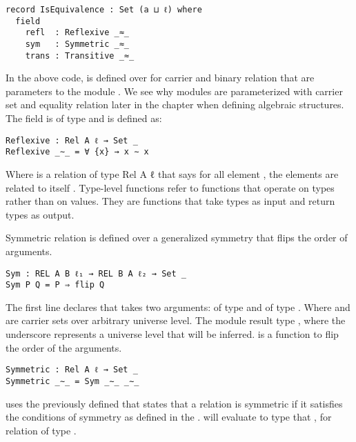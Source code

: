\begin{verbatim}
record IsEquivalence : Set (a ⊔ ℓ) where
  field
    refl  : Reflexive _≈_
    sym   : Symmetric _≈_
    trans : Transitive _≈_
\end{verbatim}

In the above code,  is defined over for carrier  and binary relation  that are parameters to the
module . We see why modules are parameterized with carrier
set and equality relation later in the chapter when defining algebraic
structures. The field  is of type  and is
defined as:

\begin{verbatim}
Reflexive : Rel A ℓ → Set _
Reflexive _∼_ = ∀ {x} → x ∼ x
\end{verbatim}

Where  is a relation of type {Rel A ℓ} that says for all element
, the elements are related to itself . Type-level
functions refer to functions that operate on types rather than on values. They
are functions that take types as input and return types as output.

Symmetric relation is defined over a generalized symmetry that flips the order of arguments.

\begin{verbatim}
Sym : REL A B ℓ₁ → REL B A ℓ₂ → Set _
Sym P Q = P ⇒ flip Q
\end{verbatim}
The first line declares  that takes two arguments:  of
type  and  of type . Where
 and  are carrier sets over arbitrary universe level. The
module result type , where the underscore represents a universe
level that will be inferred.  is a function to flip the order of
the arguments. 

\begin{verbatim}
Symmetric : Rel A ℓ → Set _
Symmetric _∼_ = Sym _∼_ _∼_
\end{verbatim}

 uses the previously defined  that states that a
relation  is symmetric if it satisfies the conditions of symmetry as
defined in the .  will evaluate to type that
,  for relation  of type
.

